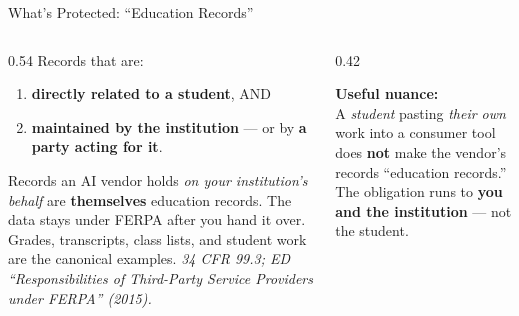 \documentclass[aspectratio=169, 10pt]{beamer}
\newcommand{\cmcite}[1]{{\scriptsize\color{CoolGray}\textit{#1}}}
\begin{document}
\begin{frame}{What's Protected: ``Education Records''}
\begin{columns}[T]
\begin{column}{0.54\textwidth}
\small Records that are:
\vskip3pt
\begin{enumerate}\setlength{\itemsep}{2pt}
  \item \textbf{directly related to a student}, AND
  \item \textbf{maintained by the institution} --- or by \textbf{a party acting for it}.
\end{enumerate}
\vskip5pt
Records an AI vendor holds \emph{on your institution's behalf} are \textbf{themselves} education records. The data stays under FERPA after you hand it over.
\vskip4pt
{\small Grades, transcripts, class lists, and student work are the canonical examples.}
\vskip4pt
\cmcite{34 CFR 99.3; ED ``Responsibilities of Third-Party Service Providers under FERPA'' (2015).}
\end{column}
\begin{column}{0.42\textwidth}
\begin{tcolorbox}[quotebox]
\small
\textbf{Useful nuance:}\\[3pt]
A \emph{student} pasting \emph{their own} work into a consumer tool does \textbf{not} make the vendor's records ``education records.''
\vskip4pt
The obligation runs to \textbf{you and the institution} --- not the student.
\end{tcolorbox}
\end{column}
\end{columns}
\end{frame}
\end{document}
